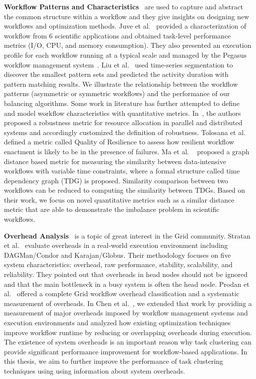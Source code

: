 \textbf{Workflow Patterns and Characteristics}~\cite{Juve2013, Liu2008} are used to capture and abstract the common structure within a workflow and they give insights on designing new workflows and optimization methods. Juve et al.~\cite{Juve2013} provided a characterization of workflow from 6 scientific applications and obtained task-level performance metrics (I/O, CPU, and memory consumption). They also presented an execution profile for each workflow running at a typical scale and managed by the Pegasus workflow management system~\cite{Deelman2005}. Liu et al.~\cite{Liu2008} used time-series segmentation to discover the smallest pattern sets and 
predicted the activity duration with pattern matching results. We illustrate the relationship between the workflow patterns (asymmetric or symmetric workflows) and the performance of our balancing algorithms. 
Some work in literature has further attempted to define and model workflow characteristics with quantitative metrics. In~\cite{Ali2004}, the authors proposed a robustness metric for resource allocation in parallel and distributed systems and accordingly customized the definition of robustness. Tolosana et al.~\cite{Tolosana2011} defined a metric called Quality of Resilience to assess how resilient workflow enactment is likely to be in the presence of failures. Ma et al. ~\cite{Ma:2014:GDB:2560969.2561388} proposed a graph distance based metric for measuring the similarity between data-intensive workflows with variable time constraints, where a formal structure called time dependency graph (TDG) is proposed. Similarity comparison between two workflows can be reduced to computing the similarity between TDGs. Based on their work, we focus on novel quantitative metrics such as a similar distance metric that are able to demonstrate the imbalance problem in scientific workflows. 

\textbf{Overhead Analysis}~\cite{Ostberg2011, Prodan2008, Chen2011} is a topic of great interest in the Grid community. Stratan et al.~\cite{Stratan2008} evaluate overheads in a real-world execution environment including DAGMan/Condor and Karajan/Globus. Their methodology focuses on five system characteristics: overhead, raw performance, stability, scalability, and reliability. They pointed out that overheads in head nodes should not be ignored and that the main bottleneck in a busy system is often the head node. Prodan et al.~\cite{Prodan2008} offered a complete Grid workflow overhead classification and a systematic measurement of overheads. In Chen et al.~\cite{Chen2011}, we extended that work by providing a measurement of major overheads imposed by workflow management systems and execution environments and analyzed how existing optimization techniques improve workflow runtime by reducing or overlapping overheads during execution. The existence of system overheads is an important reason why task clustering can provide significant performance improvement for workflow-based applications. In this thesis, we aim to further improve the performance of task clustering techniques using using information about system overheads. 



